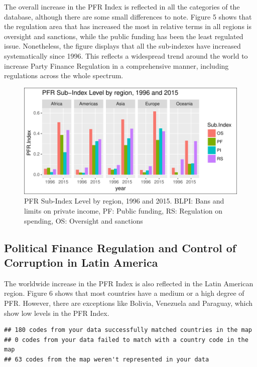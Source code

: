 \documentclass[12,twoside]{article}
\begin{document}
The overall increase in the PFR Index is reflected in all the categories
of the database, although there are some small differences to note.
Figure 5 shows that the regulation area that has increased the most in
relative terms in all regions is oversight and sanctions, while the
public funding has been the least regulated issue. Nonetheless, the
figure displays that all the sub-indexes have increased systematically
since 1996. This reflects a widespread trend around the world to
increase Party Finance Regulation in a comprehensive manner, including
regulations across the whole spectrum. \pagebreak

\begin{figure}[h]

{\centering \includegraphics{thesis_body_files/figure-latex/figure_v-1} 

}

\caption{PFR Sub-Index Level by region, 1996 and 2015. BLPI: Bans and limits on private income, PF: Public funding, RS: Regulation on spending, OS: Oversight and sanctions}\label{fig:figure_v}
\end{figure}

\subsection{Political Finance Regulation and Control of Corruption in
Latin
America}\label{political-finance-regulation-and-control-of-corruption-in-latin-america}

The worldwide increase in the PFR Index is also reflected in the Latin
American region. Figure 6 shows that most countries have a medium or a
high degree of PFR. However, there are exceptions like Bolivia,
Venezuela and Paraguay, which show low levels in the PFR Index.
\pagebreak

\begin{verbatim}
## 180 codes from your data successfully matched countries in the map
## 0 codes from your data failed to match with a country code in the map
## 63 codes from the map weren't represented in your data
\end{verbatim}
\end{document}
